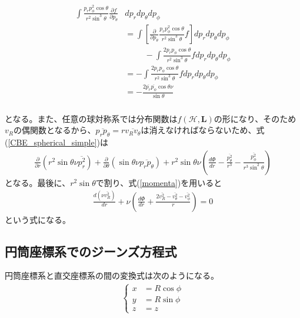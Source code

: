 \begin{align}
\begin{aligned}
	\int \frac{p_r p^2_{\phi}\cos\theta}{r^2\sin^3\theta}\frac{\partial f}{\partial p_{\theta}}& dp_r dp_{\theta} dp_{\phi} \\
	&= \int \left[ \frac{\partial}{\partial p_{\theta}}\frac{p_r p^2_{\phi}\cos\theta}{r^2\sin^3\theta}f\right] dp_r dp_{\theta} dp_{\phi} \\
	& \hspace{1cm}- \int \frac{2p_r p_{\phi}\cos\theta}{r^2\sin^3\theta}f dp_r dp_{\theta} dp_{\phi} \\
	&= -\int \frac{2p_r p_{\phi}\cos\theta}{r^2\sin^3\theta}f dp_r dp_{\theta} dp_{\phi} \\
	&= -\frac{2\overline{p_r}\overline{p_{\phi}}\cos\theta\nu}{\sin\theta} \\
\end{aligned}
\end{align}

となる。また、任意の球対称系では分布関数は$f(\mathcal{H}, \bm L)$の形になり、そのため$v_R$の偶関数となるから、$\overline{p_r p_{\theta}} = r\overline{v_R v_{\theta}}$は消えなければならないため、式(\ref{CBE_spherical_simple})は
\begin{align}
	\frac{\partial}{\partial r}(r^2\sin\theta\nu\overline{p_r^2}) + \frac{\partial}{\partial \theta}(\sin\theta\nu\overline{p_rp_{\theta}}) + r^2\sin\theta\nu\left(\frac{d\Phi}{dr} - \frac{\overline{p_{\theta}^2}}{r^3} - \frac{\overline{p_{\phi}^2}}{r^3\sin^2\theta}\right)
\end{align}
となる。最後に、$r^2\sin\theta$で割り、式(\ref{momenta})を用いると
\begin{align}
	\frac{d(\nu \overline{v_R^2})}{dr} + \nu \left(\frac{d\Phi}{dr} + \frac{2\overline{v_R^2} - \overline{v_{\theta}^2} - \overline{v_{\phi}^2}}{r} \right) = 0
\end{align} 
という式になる。


\subsection{円筒座標系でのジーンズ方程式}
円筒座標系と直交座標系の間の変換式は次のようになる。
\begin{align}
	\begin{cases}
		x &= R\cos\phi \\
		y &= R\sin\phi \\
		z &= z
	\end{cases}
\end{align}

